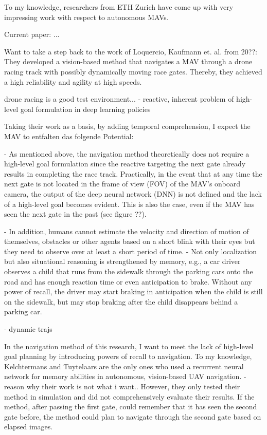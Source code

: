 To my knowledge, researchers from ETH Zurich have come up with very impressing work 
with respect to autonomous MAVs.

Current paper: ...

Want to take a step back to the work of Loquercio, Kaufmann et. al. \cite{Kaufmann2018} from 20??:
They developed a vision-based method that navigates a MAV through a drone racing 
track with possibly dynamically moving race gates.
Thereby, they achieved a high reliability and agility at high speeds.

drone racing is a good test environment...
- reactive, inherent problem of high-level goal formulation in deep learning policies

Taking their work as a basis,
by adding temporal comprehension,
I expect the MAV to entfalten das folgende Potential:

- As mentioned above, the navigation method theoretically does not require a high-level goal formulation
since the reactive targeting the next gate already results in completing the race track.
Practically, in the event that at any time the next gate is not located 
in the frame of view (FOV) of the MAV's onboard camera,
the output of the deep neural network (DNN) is not defined and the lack of a high-level goal becomes evident.
This is also the case, even if the MAV has seen the next gate in the past (see figure ??).

- In addition, humans cannot estimate the velocity and direction of motion of themselves, obstacles or other agents
based on a short blink with their eyes but they need to observe over at least a short period of time.
- Not only localization but also situational reasoning is strengthened by memory,
e.g., a car driver observes a child that runs from the sidewalk through the parking cars onto the road
and has enough reaction time or even anticipation to brake.
Without any power of recall, the driver may start braking in anticipation
when the child is still on the sidewalk, but may stop braking after the child disappears behind a parking car.

- dynamic trajs

In the navigation method of this research, I want to meet the lack of high-level goal planning 
by introducing powers of recall to navigation.
To my knowledge, Kelchtermans and Tuytelaars \cite{Kelchtermans2017}
are the only ones who used a recurrent neural network for memory abilities in autonomous, 
vision-based UAV navigation. \cite{Shakeri2019}
-reason why their work is not what i want..
However, they only tested their method in simulation and did not comprehensively evaluate their results.
If the method, after passing the first gate, could remember that it has seen the second gate before,
the method could plan to navigate through the second gate based on elapsed images.




